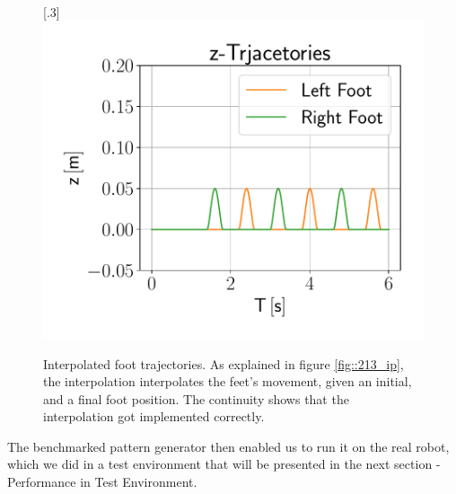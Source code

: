\begin{figure}[h!]
	[.3\linewidth]{\includegraphics[scale=.3]{chapters/04_experiments/01_user_controlled_walking/01_benchmarking/interpolated_z_trajectories.pdf}}
	\caption{Interpolated foot trajectories. As explained in figure \ref{fig::213_ip}, the interpolation interpolates the feet's movement, given an initial, and a final foot position. The continuity shows that the interpolation got implemented correctly.}
	\label{fig::411_benchmarking_inter}
\end{figure}
 The benchmarked pattern generator then enabled us to run it on the real robot, which we did in a test environment that will be presented in the next section - Performance in Test Environment.
\FloatBarrier
